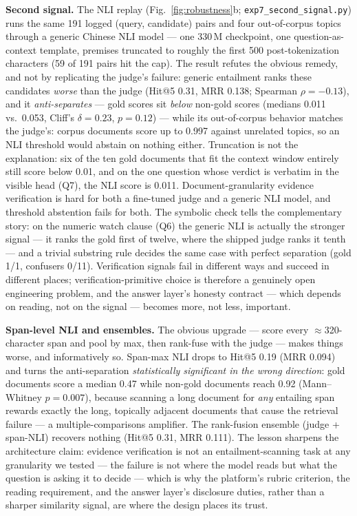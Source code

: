 \textbf{Second signal.} The NLI replay
(Fig.~\ref{fig:robustness}b; \texttt{exp7\_second\_signal.py})
runs the same 191 logged (query, candidate) pairs and four out-of-corpus
topics through a generic Chinese NLI model --- one 330\,M checkpoint, one
question-as-context template, premises truncated to roughly the first 500
post-tokenization characters (59 of 191 pairs hit the cap). The result
refutes the obvious remedy, and not by replicating the judge's failure:
generic entailment ranks these candidates \emph{worse} than the judge
(Hit@5 0.31, MRR 0.138; Spearman $\rho = -0.13$), and it
\emph{anti-separates} --- gold scores sit \emph{below} non-gold scores
(medians 0.011 vs.\ 0.053, Cliff's $\delta = 0.23$, $p = 0.12$) --- while
its out-of-corpus behavior matches the judge's: corpus documents score up
to 0.997 against unrelated topics, so an NLI threshold would abstain on
nothing either. Truncation is not the explanation: six of the ten gold
documents that fit the context window entirely still score below 0.01,
and on the one question whose verdict is verbatim in the visible head
(Q7), the NLI
score is 0.011. Document-granularity evidence verification is hard for
both a fine-tuned judge and a generic NLI model, and threshold
abstention fails for both. The symbolic check tells the complementary
story: on the numeric watch clause (Q6) the generic NLI is actually the
stronger signal --- it ranks the gold first of twelve, where the shipped
judge ranks it tenth --- and a trivial substring rule decides the same
case with perfect separation (gold 1/1, confusers 0/11). Verification
signals fail in different ways and succeed in different places;
verification-primitive choice is therefore a genuinely open engineering
problem, and the answer layer's
honesty contract --- which depends on reading, not on the signal ---
becomes more, not less, important.

\textbf{Span-level NLI and ensembles.} The obvious upgrade --- score
every $\approx$320-character span and pool by max, then rank-fuse with
the judge --- makes things worse, and informatively so. Span-max NLI
drops to Hit@5 0.19 (MRR 0.094) and turns the anti-separation
\emph{statistically significant in the wrong direction}: gold documents
score a median 0.47 while non-gold documents reach 0.92
(Mann--Whitney $p = 0.007$), because scanning a long document for
\emph{any} entailing span rewards exactly the long, topically adjacent
documents that cause the retrieval failure --- a multiple-comparisons
amplifier. The rank-fusion ensemble (judge + span-NLI) recovers nothing
(Hit@5 0.31, MRR 0.111). The lesson sharpens the architecture claim:
evidence verification is not an entailment-scanning task at any
granularity we tested --- the failure is not where the model reads but
what the question is asking it to decide --- which is why the platform's
rubric criterion, the reading requirement, and the answer layer's
disclosure duties, rather than a sharper similarity signal, are where
the design places its trust.

